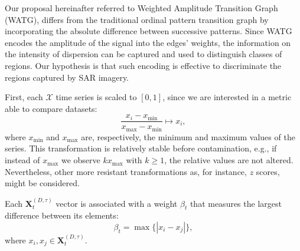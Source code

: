 \documentclass[journal]{IEEEtran}
\providecommand{\DIFaddbegin}{} %
\providecommand{\DIFaddend}{} %
\newcommand{\DIFaddincludegraphics}[2][]{{\color{blue}\fbox{\DIFOincludegraphics[#1]{#2}}}} %
\DeclareRobustCommand{\DIFaddbegin}{\DIFOaddbegin \let\includegraphics\DIFaddincludegraphics} %
\DeclareRobustCommand{\DIFaddend}{\DIFOaddend \let\includegraphics\DIFOincludegraphics} %
\begin{document}
	Our proposal hereinafter referred to  Weighted Amplitude Transition Graph (WATG), differs from the traditional ordinal pattern transition graph by incorporating the absolute difference between successive patterns. 
	Since WATG encodes the amplitude of the signal into the edges' weights, the information on the intensity of dispersion can be captured and used to distinguish classes of regions. 
	Our hypothesis is that such encoding is effective to discriminate the regions captured by SAR imagery.
	
	
	First, each $\mathcal{X}$ time series is scaled to $[0, 1]$, since we are interested in a metric able to compare datasets:
	\begin{equation}
	\frac{x_i - x_{\min}}{x_{\max} - x_{\min}} \longmapsto x_i,
	\DIFaddbegin \label{eq:scaling}
	\DIFaddend \end{equation}
	where $x_{\min}$ and $x_{\max}$ are, respectively, the minimum and maximum values of the series.
	This transformation is relatively stable before contamination, e.g., if instead of $x_{\max}$ we observe $k x_{\max}$ with $k\geq 1$, the relative values are not altered. Nevertheless, other more resistant transformations as, for instance, $z$ scores, might be considered.
	
	Each $\mathbf{X}^{(D, \tau)}_t$ vector is associated with a weight $\beta_t$ that measures the largest difference between its elements:
	\begin{equation}
	\beta_t = \max\{|x_i - x_j|\},
	\end{equation}
	where $x_i, x_j \in \mathbf{X}^{(D, \tau)}_t$.
	
\end{document}

